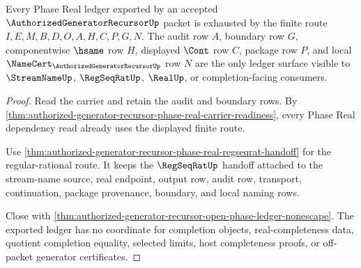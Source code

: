 \begin{theorem}
\label{thm:authorized-generator-recursor-phase-real-ledger-nonescape}
Every Phase Real ledger exported by an accepted $\AuthorizedGeneratorRecursorUp$ packet is exhausted by the finite route $I,E,M,B,D,O,A,H,C,P,G,N$. The audit row $A$, boundary row $G$, componentwise $\hsame$ row $H$, displayed $\Cont$ row $C$, package row $P$, and local $\NameCert_{\AuthorizedGeneratorRecursorUp}$ row $N$ are the only ledger surface visible to $\StreamNameUp$, $\RegSeqRatUp$, $\RealUp$, or completion-facing consumers.
\end{theorem}
\begin{proof}
Read the carrier and retain the audit and boundary rows. By \autoref{thm:authorized-generator-recursor-phase-real-carrier-readiness}, every Phase Real dependency read already uses the displayed finite route.

Use \autoref{thm:authorized-generator-recursor-phase-real-regseqrat-handoff} for the regular-rational route. It keeps the $\RegSeqRatUp$ handoff attached to the stream-name source, real endpoint, output row, audit row, transport, continuation, package provenance, boundary, and local naming rows.

Close with \autoref{thm:authorized-generator-recursor-open-phase-ledger-nonescape}. The exported ledger has no coordinate for completion objects, real-completeness data, quotient completion equality, selected limits, host completeness proofs, or off-packet generator certificates.
\end{proof}

